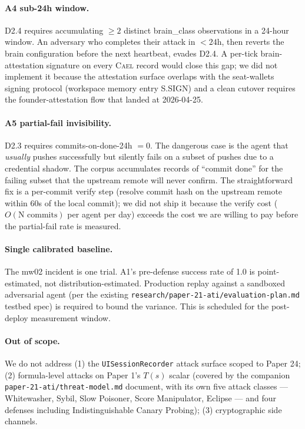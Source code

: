 \documentclass[letterpaper,twocolumn,10pt]{article}
\newcommand{\cael}{\textsc{Cael}}
\begin{document}
\paragraph{A4 sub-24h window.} D2.4 requires accumulating $\geq 2$
distinct brain\_class observations in a 24-hour window. An adversary
who completes their attack in $<24\text{h}$, then reverts the brain
configuration before the next heartbeat, evades D2.4. A per-tick
brain-attestation signature on every \cael{} record would close this
gap; we did not implement it because the attestation surface
overlaps with the seat-wallets signing protocol (workspace memory
entry S.SIGN) and a clean cutover requires the founder-attestation
flow that landed at 2026-04-25.

\paragraph{A5 partial-fail invisibility.} D2.3 requires
commits-on-done-24h $= 0$. The dangerous case is the agent that
\emph{usually} pushes successfully but silently fails on a subset of
pushes due to a credential shadow. The corpus accumulates records
of ``commit done'' for the failing subset that the upstream remote
will never confirm. The straightforward fix is a per-commit verify
step (resolve commit hash on the upstream remote within 60s of the
local commit); we did not ship it because the verify cost
($O(\text{N commits})$ per agent per day) exceeds the cost we are
willing to pay before the partial-fail rate is measured.

\paragraph{Single calibrated baseline.} The mw02 incident is one
trial. A1's pre-defense success rate of 1.0 is point-estimated, not
distribution-estimated. Production replay against a sandboxed
adversarial agent (per the existing
\texttt{research/paper-21-ati/evaluation-plan.md} testbed spec) is
required to bound the variance. This is scheduled for the post-deploy
measurement window.

\paragraph{Out of scope.} We do not address (1) the
\texttt{UISessionRecorder} attack surface scoped to Paper 24; (2)
formula-level attacks on Paper 1's $T(s)$ scalar (covered by the
companion \texttt{paper-21-ati/threat-model.md} document, with its
own five attack classes — Whitewasher, Sybil, Slow Poisoner, Score
Manipulator, Eclipse — and four defenses including Indistinguishable
Canary Probing); (3) cryptographic side channels.
\end{document}
